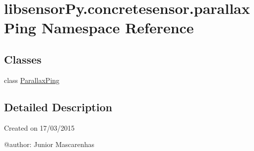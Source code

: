 \hypertarget{namespacelibsensorPy_1_1concretesensor_1_1parallaxPing}{}\section{libsensor\+Py.\+concretesensor.\+parallax\+Ping Namespace Reference}
\label{namespacelibsensorPy_1_1concretesensor_1_1parallaxPing}
\subsection*{Classes}
\begin{DoxyCompactItemize}
\item 
class \hyperlink{classlibsensorPy_1_1concretesensor_1_1parallaxPing_1_1ParallaxPing}{Parallax\+Ping}
\end{DoxyCompactItemize}


\subsection{Detailed Description}
\begin{DoxyVerb}Created on 17/03/2015

@author: Junior Mascarenhas
\end{DoxyVerb}
 